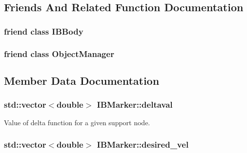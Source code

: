 \subsection{Friends And Related Function Documentation}
\subsubsection[{\texorpdfstring{I\+B\+Body}{IBBody}}]{\setlength{\rightskip}{0pt plus 5cm}friend class {\bf I\+B\+Body}\hspace{0.3cm}{\ttfamily [friend]}}\hypertarget{class_i_b_marker_a5d93aa5aec680a2b395a71266fe4ac92}{}\label{class_i_b_marker_a5d93aa5aec680a2b395a71266fe4ac92}
\subsubsection[{\texorpdfstring{Object\+Manager}{ObjectManager}}]{\setlength{\rightskip}{0pt plus 5cm}friend class {\bf Object\+Manager}\hspace{0.3cm}{\ttfamily [friend]}}\hypertarget{class_i_b_marker_a8b86bdcdb7c54a536293d8632363e114}{}\label{class_i_b_marker_a8b86bdcdb7c54a536293d8632363e114}


\subsection{Member Data Documentation}
\subsubsection[{\texorpdfstring{deltaval}{deltaval}}]{\setlength{\rightskip}{0pt plus 5cm}std\+::vector$<$double$>$ I\+B\+Marker\+::deltaval\hspace{0.3cm}{\ttfamily [protected]}}\hypertarget{class_i_b_marker_a82296e15048c55bd121245d85b076168}{}\label{class_i_b_marker_a82296e15048c55bd121245d85b076168}


Value of delta function for a given support node. 

\subsubsection[{\texorpdfstring{desired\+\_\+vel}{desired_vel}}]{\setlength{\rightskip}{0pt plus 5cm}std\+::vector$<$double$>$ I\+B\+Marker\+::desired\+\_\+vel\hspace{0.3cm}{\ttfamily [protected]}}\hypertarget{class_i_b_marker_ad9535b494684533ace9a9523c4df26bf}{}\label{class_i_b_marker_ad9535b494684533ace9a9523c4df26bf}


